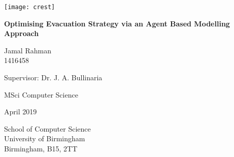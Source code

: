 \begin{titlepage}
   \begin{center}
        \vspace*{1cm}
        
        \texttt{[image: crest]}
        
        {\Large\textbf{Optimising Evacuation Strategy via an Agent Based Modelling Approach}}
 
        \vspace{1.5cm}
 
        Jamal Rahman\\
        1416458\\
 
        \vspace{1cm}
        
        Supervisor: Dr. J. A. Bullinaria
 
        \vspace{1cm}
        
        MSci Computer Science
        
        \vspace{1cm}
        
        April 2019
 
       \vfill
 
       \vspace{0.8cm}
 
 
       School of Computer Science\\
       University of Birmingham\\
       Birmingham, B15, 2TT\\
 
   \end{center}
\end{titlepage}